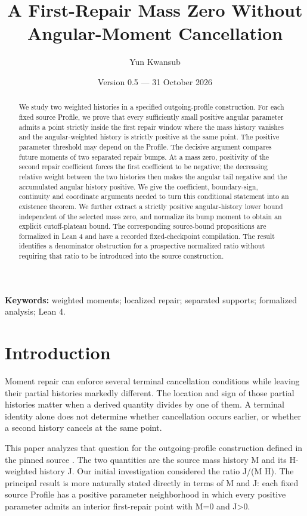 \documentclass[11pt,a4paper]{article}
\author{Yun Kwansub}
\date{Version 0.5 --- 31 October 2026}
\title{A First-Repair Mass Zero Without Angular-Moment Cancellation}
\begin{document}
\maketitle
\begin{abstract}

We study two weighted histories in a specified outgoing-profile construction. For each fixed source Profile, we prove that every sufficiently small positive angular parameter admits a point strictly inside the first repair window where the mass history vanishes and the angular-weighted history is strictly positive at the same point. The positive parameter threshold may depend on the Profile. The decisive argument compares future moments of two separated repair bumps. At a mass zero, positivity of the second repair coefficient forces the first coefficient to be negative; the decreasing relative weight between the two histories then makes the angular tail negative and the accumulated angular history positive. We give the coefficient, boundary-sign, continuity and coordinate arguments needed to turn this conditional statement into an existence theorem. We further extract a strictly positive angular-history lower bound independent of the selected mass zero, and normalize its bump moment to obtain an explicit cutoff-plateau bound. The corresponding source-bound propositions are formalized in Lean 4 and have a recorded fixed-checkpoint compilation. The result identifies a denominator obstruction for a prospective normalized ratio without requiring that ratio to be introduced into the source construction.

\end{abstract}
\noindent \textbf{Keywords:} weighted moments; localized repair; separated supports; formalized analysis; Lean 4.

\section{Introduction}

Moment repair can enforce several terminal cancellation conditions while leaving their partial histories markedly different. The location and sign of those partial histories matter when a derived quantity divides by one of them. A terminal identity alone does not determine whether cancellation occurs earlier, or whether a second history cancels at the same point.

This paper analyzes that question for the outgoing-profile construction defined in the pinned  source \cite{ref1}. The two quantities are the source mass history M and its H-weighted history J. Our initial investigation considered the ratio J/(M H). The principal result is more naturally stated directly in terms of M and J: each fixed source Profile has a positive parameter neighborhood in which every positive parameter admits an interior first-repair point with M=0 and J>0.
\end{document}
